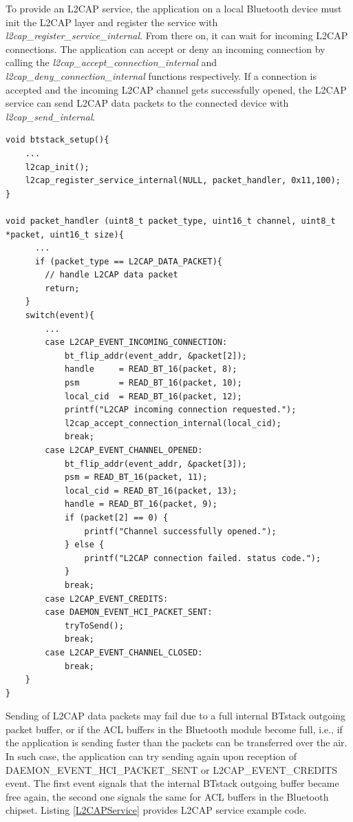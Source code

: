 \documentclass[a4paper,titlepage,oneside,12pt]{amsart} %
\begin{document}
To provide an L2CAP service, the application on a local Bluetooth device must init the L2CAP layer and register the service with \emph{l2cap\_register\_service\_internal}. From there on, it can wait for incoming L2CAP connections. The application can accept or deny an incoming connection by calling the \emph{l2cap\_accept\_connection\_internal} and \emph{l2cap\_deny\_connection\_internal} functions respectively. If a connection is accepted and the incoming L2CAP channel gets successfully opened, the L2CAP service can send L2CAP data packets to the connected device with \emph{l2cap\_send\_internal}. 

\begin{lstlisting}[caption=Providing an L2CAP service., label=L2CAPService]
void btstack_setup(){
    ...
    l2cap_init();
    l2cap_register_service_internal(NULL, packet_handler, 0x11,100);
}

void packet_handler (uint8_t packet_type, uint16_t channel, uint8_t *packet, uint16_t size){
      ...
      if (packet_type == L2CAP_DATA_PACKET){
        // handle L2CAP data packet
        return;
    }
    switch(event){
        ...
        case L2CAP_EVENT_INCOMING_CONNECTION:
            bt_flip_addr(event_addr, &packet[2]);
            handle     = READ_BT_16(packet, 8); 
            psm        = READ_BT_16(packet, 10); 
            local_cid  = READ_BT_16(packet, 12); 
            printf("L2CAP incoming connection requested.");
            l2cap_accept_connection_internal(local_cid);
            break;
        case L2CAP_EVENT_CHANNEL_OPENED:
            bt_flip_addr(event_addr, &packet[3]);
            psm = READ_BT_16(packet, 11); 
            local_cid = READ_BT_16(packet, 13); 
            handle = READ_BT_16(packet, 9);
            if (packet[2] == 0) {
                printf("Channel successfully opened.");
            } else {
                printf("L2CAP connection failed. status code.");
            }
            break;        
        case L2CAP_EVENT_CREDITS:
        case DAEMON_EVENT_HCI_PACKET_SENT:
            tryToSend();
            break;
        case L2CAP_EVENT_CHANNEL_CLOSED:
            break;
    }
}
\end{lstlisting}

Sending of L2CAP data packets may fail due to a full internal BTstack outgoing packet buffer, or if the ACL buffers in the Bluetooth module become full, i.e., if the application is sending faster than the packets can be transferred over the air. In such case, the application can try sending again upon reception of DAEMON\_EVENT\_HCI\_PACKET\_SENT or L2CAP\_EVENT\_CREDITS event. The first event signals that the internal BTstack outgoing buffer became free again, the second one signals the same for ACL buffers in the Bluetooth chipset. Listing \ref{L2CAPService} provides L2CAP service example code.
\end{document}
